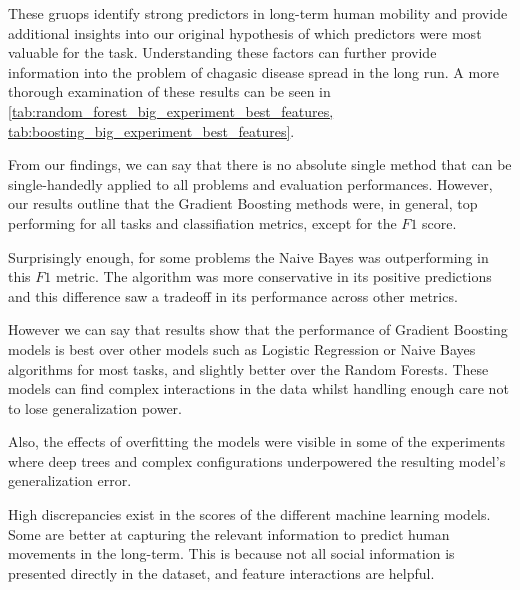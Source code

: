 These gruops identify strong predictors in long-term human mobility and provide additional insights into our original hypothesis of which predictors were most valuable for the task.
Understanding these factors can further provide information into the problem of chagasic disease spread in the long run.
A more thorough examination of these results can be seen in \cref{tab:random_forest_big_experiment_best_features, tab:boosting_big_experiment_best_features}.




From our findings, we can say that there is no absolute single method that can be single-handedly applied to all problems and evaluation performances.
However, our results outline that the Gradient Boosting methods were, in general, top performing for all tasks and classifiation metrics, except for the $F1$ score.

Surprisingly enough, for some problems the Naive Bayes was outperforming in this $F1$ metric.
The algorithm was more conservative in its positive predictions and this difference saw a tradeoff in its performance across other metrics.

However we can say that results show that the performance of Gradient Boosting models is best over other models such as Logistic Regression or Naive Bayes algorithms for most tasks, and slightly better over the Random Forests.
These models can find complex interactions in the data whilst handling enough care not to lose generalization power.








Also, the effects of overfitting the models were visible in some of the experiments where deep trees and complex configurations underpowered the resulting model's generalization error.



High discrepancies exist in the scores of the different machine learning models.
Some are better at capturing the relevant information to predict human movements in the long-term.
This is because not all social information is presented directly in the dataset, and feature interactions are helpful.


